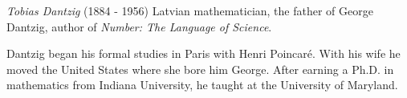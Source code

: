 \documentclass[12pt]{article}
\begin{document}
\emph{Tobias Dantzig} (1884 - 1956) Latvian mathematician, the father of George Dantzig, author of {\it Number: The Language of Science}.

Dantzig began his formal studies in Paris with Henri Poincar\'e. With his wife he moved the  United States where she bore him George. After earning a Ph.D. in mathematics from Indiana University, he taught at the University of Maryland.
\end{document}
